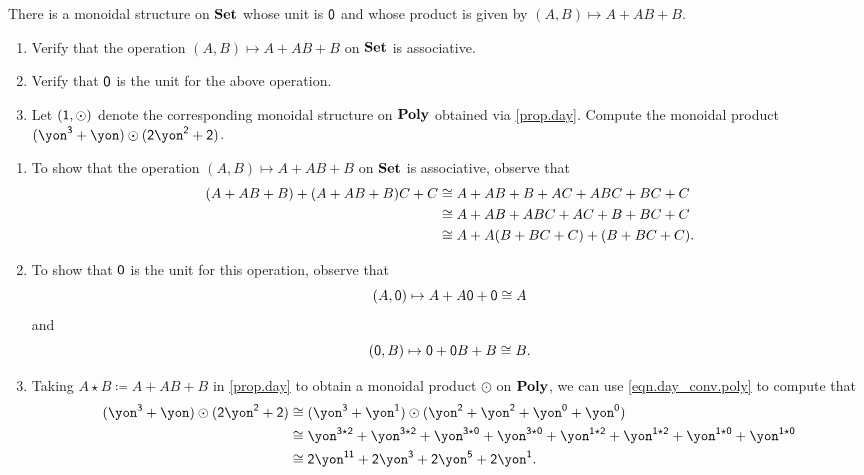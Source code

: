 \documentclass[Book-Poly]{subfiles}
\begin{document}
\begin{exercise}
There is a monoidal structure on $\mathbf{Set}$ whose unit is $\textsf{0}$ and whose product is given by $(A, B)\mapsto A+AB+B$.
\begin{enumerate}
	\item Verify that the operation $(A, B)\mapsto A+AB+B$ on $\mathbf{Set}$ is associative.
	\item Verify that $\textsf{0}$ is the unit for the above operation.
	\item Let $(\textsf{1},\odot)$ denote the corresponding monoidal structure on $\mathbf{Poly}$ obtained via \cref{prop.day}. Compute the monoidal product $(\yon^\3+\yon)\odot(\2\yon^\2+\2)$.
\qedhere
\end{enumerate}
\begin{solution}
\begin{enumerate}
    \item To show that the operation $(A,B)\mapsto A+AB+B$ on $\mathbf{Set}$ is associative, observe that
    \begin{align*}
        (A + AB + B) + (A + AB + B)C + C &\cong A + AB + B + AC + ABC + BC + C \\
        &\cong A + AB + ABC + AC + B + BC + C \\
        &\cong A + A(B + BC + C) + (B + BC + C).
    \end{align*}
    \item To show that $\textsf{0}$ is the unit for this operation, observe that
    \[
        (A, \textsf{0}) \mapsto A + A\textsf{0} + \textsf{0} \cong A
    \]
    and
    \[
        (\textsf{0}, B) \mapsto \textsf{0} + \textsf{0}B + B \cong B.
    \]
    \item Taking $A \star B \coloneqq A + AB + B$ in \cref{prop.day} to obtain a monoidal product $\odot$ on $\mathbf{Poly}$, we can use \eqref{eqn.day_conv.poly} to compute that
    \begin{align*}
        (\yon^\3+\yon)\odot(\2\yon^\2+\2) &\iso (\yon^\3+\yon^\1)\odot(\yon^\2+\yon^\2+\yon^\0+\yon^\0) \\
        &\iso \yon^{\3\star\2} + \yon^{\3\star\2} + \yon^{\3\star\0} + \yon^{\3\star\0} + \yon^{\1\star\2} + \yon^{\1\star\2} + \yon^{\1\star\0} + \yon^{\1\star\0} \\
        &\iso \2\yon^{\1\1} + \2\yon^\3 + \2\yon^\5 + \2\yon^\1.
    \end{align*}
\end{enumerate}
\end{solution}
\end{exercise}

\end{document}
